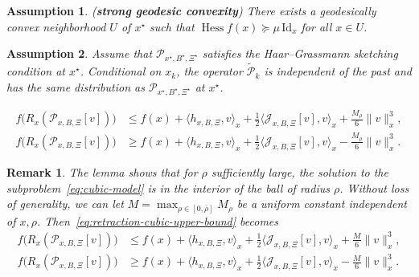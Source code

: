 \documentclass[10pt,a4paper]{amsart}
\newtheorem{assumption}{Assumption}
\newtheorem{remark}{Remark}
\newcommand{\Hess}{\operatorname{Hess}}
\begin{document}
\begin{assumption}
  (\textbf{strong geodesic convexity})
  \label{ass:strong-geo-convexity}
There exists a geodesically convex neighborhood $U$ of $x^\star$ such that $\Hess f(x)\succeq \mu \,\mathrm{Id}_x$ for all $x\in U$.
\end{assumption}

\begin{assumption}
  \label{ass:local-transported-resampling}
  Assume that $\mathcal P_{x^\star,B^\star,\Xi^\star}$ satisfies the Haar--Grassmann sketching condition at $x^\star$.
  Conditional on $x_k$, the operator $\widetilde{\mathcal P}_k$ is independent of the past and has the same distribution as 
  $
  \mathcal P_{x^\star,B^\star,\Xi^\star}
  $ at $x^\star$.
  \end{assumption}

  \begin{equation}
  \label{eq:retraction-cubic-upper-bound}
  \begin{aligned}
  f\big(R_x(\mathcal{P}_{x, B, \Xi} [v])\big) &\le f(x)+\langle h_{x, B, \Xi},v\rangle_x+\tfrac{1}{2}\langle \mathcal{J}_{x, B, \Xi} [v],v\rangle_x+\tfrac{M_\rho}{6}\|v\|_x^{3} ,\\
  f\big(R_x(\mathcal{P}_{x, B, \Xi} [v])\big) &\ge f(x)+\langle h_{x, B, \Xi},v\rangle_x+\tfrac{1}{2}\langle \mathcal{J}_{x, B, \Xi} [v],v\rangle_x - \tfrac{M_\rho}{6}\|v\|_x^{3}.
  \end{aligned}
  \end{equation}

  \begin{remark}
    \label{rem:cubic-upper-bound}
  The lemma shows that for $\rho$ sufficiently large, the solution to the subproblem~\eqref{eq:cubic-model} is in the interior of the ball of radius $\rho$. Without loss of generality, we can let $M = \max_{\rho \in [0, \bar \rho]} M_\rho$ be a uniform constant independent of $x, \rho$. Then~\eqref{eq:retraction-cubic-upper-bound} becomes
  \[
  \begin{aligned}
  f\big(R_x(\mathcal{P}_{x, B, \Xi} [v])\big) &\le f(x)+\langle h_{x, B, \Xi},v\rangle_x+\tfrac{1}{2}\langle \mathcal{J}_{x, B, \Xi} [v],v\rangle_x+\tfrac{M}{6}\|v\|_x^{3} ,\\
  f\big(R_x(\mathcal{P}_{x, B, \Xi} [v])\big) &\ge f(x)+\langle h_{x, B, \Xi},v\rangle_x+\tfrac{1}{2}\langle \mathcal{J}_{x, B, \Xi} [v],v\rangle_x - \tfrac{M}{6}\|v\|_x^{3}.
  \end{aligned}
  \]
  \end{remark}
\end{document}
